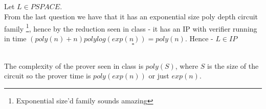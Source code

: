\subsection{}
Let $L\in PSPACE$.\\
From the last question we have 
that it has an exponential size poly depth
circuit family \footnote{Exponential size'd family sounds amazing},
hence by the reduction seen in class -
it has an IP with verifier running 
in time $(poly(n)+n)polylog(exp(n))=poly(n)$.
Hence - $L\in IP$
\[
	\square
\]

\subsection{}
The complexity of the prover seen in class
is $poly(S)$, where $S$ is the size of the
circuit so the prover
time is $poly(exp(n))$ or just $exp(n)$.